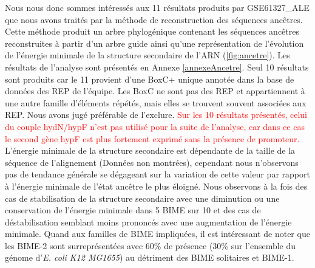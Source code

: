 \documentclass[12pt,a4paper]{report}
\begin{document}
\begin{onehalfspace}
\begin{figure}
{\label{fig:ancetre} }
\end{figure}

Nous nous donc sommes intéressés aux 11 résultats produits par GSE61327\_ALE que nous avons traités par la méthode de reconstruction des séquences ancêtres. Cette méthode produit un arbre phylogénique contenant les séquences ancêtres reconstruites à partir d'un arbre guide ainsi qu'une représentation de l'évolution de l'énergie minimale de la structure secondaire de l'ARN (\autoref{fig:ancetre}). Les résultats de l'analyse sont présentés en Annexe \ref{annexeAncetre}. Seul 10 résultats sont produits car le 11 provient d'une BoxC+ unique annotée dans la base de données des REP de l'équipe. Les BoxC ne sont pas des REP et appartiennent à une autre famille d’éléments répétés, mais elles se trouvent souvent associées aux REP. Nous avons jugé préférable de l'exclure. \textcolor{red}{Sur les 10 résultats présentés, celui du couple hydN/hypF n'est pas utilisé pour la suite de l'analyse, car dans ce cas le second gène hypF est plus fortement exprimé sans la présence de promoteur.} L'énergie minimale de la structure secondaire est dépendante de la taille de la séquence de l'alignement (Données non montrées), cependant nous n'observons pas de tendance générale se dégageant sur la variation de cette valeur par rapport à l'énergie minimale de l'état ancêtre le plus éloigné. Nous observons à la fois des cas de stabilisation de la structure secondaire avec une diminution ou une conservation de l'énergie minimale dans 5 BIME sur 10 et des cas de déstabilisation semblant moins prononcés avec une augmentation de l'énergie minimale. Quand aux familles de BIME impliquées, il est intéressant de noter que les BIME-2 sont surreprésentées avec 60\% de présence (30\% sur l'ensemble du génome d'\textit{E. coli K12 MG1655}) au détriment des BIME solitaires et BIME-1.


\end{onehalfspace}
\end{document}
